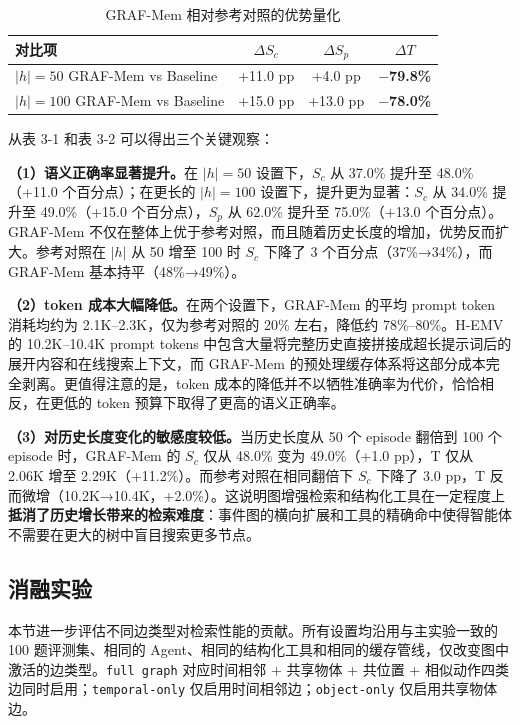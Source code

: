 \begin{table}[htbp]
\centering
\caption{GRAF-Mem 相对参考对照的优势量化}
\label{tab:3-2}
\begin{tabular}{lccc}
\toprule
对比项 & $\Delta S_c$ & $\Delta S_p$ & $\Delta T$ \\
\midrule
$|h|=50$ GRAF-Mem vs Baseline & +11.0 pp & +4.0 pp & \textbf{$-$79.8\%} \\
$|h|=100$ GRAF-Mem vs Baseline & +15.0 pp & +13.0 pp & \textbf{$-$78.0\%} \\
\bottomrule
\end{tabular}
\end{table}

从表 3-1 和表 3-2 可以得出三个关键观察：

\textbf{（1）语义正确率显著提升。}在 $|h|=50$ 设置下，$S_c$ 从 37.0\% 提升至 48.0\%（+11.0 个百分点）；在更长的 $|h|=100$ 设置下，提升更为显著：$S_c$ 从 34.0\% 提升至 49.0\%（+15.0 个百分点），$S_p$ 从 62.0\% 提升至 75.0\%（+13.0 个百分点）。GRAF-Mem 不仅在整体上优于参考对照，而且随着历史长度的增加，优势反而扩大。参考对照在 $|h|$ 从 50 增至 100 时 $S_c$ 下降了 3 个百分点（37\%→34\%），而 GRAF-Mem 基本持平（48\%→49\%）。

\textbf{（2）token 成本大幅降低。}在两个设置下，GRAF-Mem 的平均 prompt token 消耗均约为 2.1K–2.3K，仅为参考对照的 20\% 左右，降低约 78\%–80\%。H-EMV 的 10.2K–10.4K prompt tokens 中包含大量将完整历史直接拼接成超长提示词后的展开内容和在线搜索上下文，而 GRAF-Mem 的预处理缓存体系将这部分成本完全剥离。更值得注意的是，token 成本的降低并不以牺牲准确率为代价，恰恰相反，在更低的 token 预算下取得了更高的语义正确率。

\textbf{（3）对历史长度变化的敏感度较低。}当历史长度从 50 个 episode 翻倍到 100 个 episode 时，GRAF-Mem 的 $S_c$ 仅从 48.0\% 变为 49.0\%（+1.0 pp），T 仅从 2.06K 增至 2.29K（+11.2\%）。而参考对照在相同翻倍下 $S_c$ 下降了 3.0 pp，T 反而微增（10.2K→10.4K，+2.0\%）。这说明图增强检索和结构化工具在一定程度上\textbf{抵消了历史增长带来的检索难度}：事件图的横向扩展和工具的精确命中使得智能体不需要在更大的树中盲目搜索更多节点。

\subsection{消融实验}

本节进一步评估不同边类型对检索性能的贡献。所有设置均沿用与主实验一致的 100 题评测集、相同的 Agent、相同的结构化工具和相同的缓存管线，仅改变图中激活的边类型。\texttt{full graph} 对应时间相邻 + 共享物体 + 共位置 + 相似动作四类边同时启用；\texttt{temporal-only} 仅启用时间相邻边；\texttt{object-only} 仅启用共享物体边。

